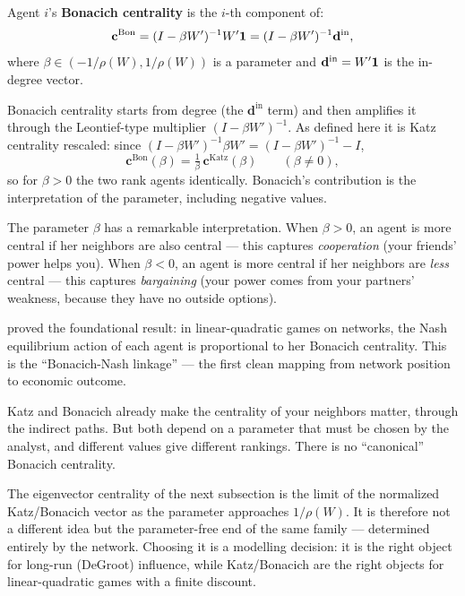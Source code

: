\documentclass[../structural_economics_book.tex]{subfiles}
\begin{document}
\begin{definition}\label{ch06:def:bonacich}
Agent $i$'s \textbf{Bonacich centrality} is the $i$-th component of:
\begin{equation}\label{ch06:eq:bonacich}
\mathbf{c}^{\text{Bon}} = (I - \beta W')^{-1} W' \mathbf{1} = (I - \beta W')^{-1} \mathbf{d}^{\text{in}},
\end{equation}
where $\beta \in (-1/\rho(W), 1/\rho(W))$ is a parameter and $\mathbf{d}^{\text{in}} = W'\mathbf{1}$ is the in-degree vector.
\end{definition}

Bonacich centrality starts from degree (the $\mathbf{d}^{\text{in}}$ term) and then amplifies it through the Leontief-type multiplier $(I - \beta W')^{-1}$. As defined here it is Katz centrality rescaled: since $(I-\beta W')^{-1}\beta W' = (I-\beta W')^{-1} - I$,
\begin{equation}\label{ch06:eq:bonacich_katz}
\mathbf{c}^{\text{Bon}}(\beta) = \tfrac{1}{\beta}\,\mathbf{c}^{\text{Katz}}(\beta) \qquad (\beta \neq 0),
\end{equation}
so for $\beta > 0$ the two rank agents identically. Bonacich's \citeyearpar{bonacich1987power} contribution is the interpretation of the parameter, including negative values.

The parameter $\beta$ has a remarkable interpretation. When $\beta > 0$, an agent is more central if her neighbors are also central --- this captures \textit{cooperation} (your friends' power helps you). When $\beta < 0$, an agent is more central if her neighbors are \textit{less} central --- this captures \textit{bargaining} (your power comes from your partners' weakness, because they have no outside options).

\citet{ballester2006whos} proved the foundational result: in linear-quadratic games on networks, the Nash equilibrium action of each agent is proportional to her Bonacich centrality. This is the ``Bonacich-Nash linkage'' --- the first clean mapping from network position to economic outcome.

\begin{intuition}
Katz and Bonacich already make the centrality of your neighbors matter, through the indirect paths. But both depend on a parameter that must be chosen by the analyst, and different values give different rankings. There is no ``canonical'' Bonacich centrality.

The eigenvector centrality of the next subsection is the limit of the normalized Katz/Bonacich vector as the parameter approaches $1/\rho(W)$. It is therefore not a different idea but the parameter-free end of the same family --- determined entirely by the network. Choosing it is a modelling decision: it is the right object for long-run (DeGroot) influence, while Katz/Bonacich are the right objects for linear-quadratic games with a finite discount.
\end{intuition}
\end{document}
